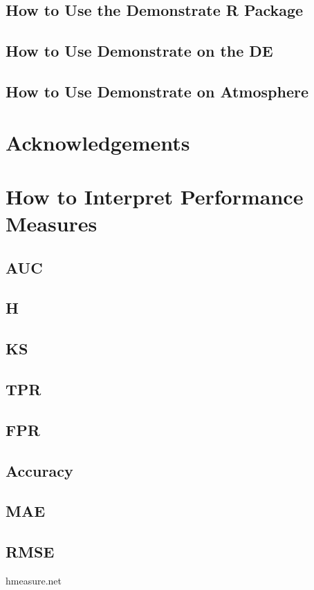 \documentclass[twoside,a4paper]{refart}
\begin{document}
\subsection{How to Use the Demonstrate R Package}

\subsection{How to Use Demonstrate on the DE}

\subsection{How to Use Demonstrate on Atmosphere}

\section{Acknowledgements}

\section{How to Interpret Performance Measures}

\subsection{AUC}

\subsection{H}

\subsection{KS}

\subsection{TPR}

\subsection{FPR}

\subsection{Accuracy}

\subsection{MAE}

\subsection{RMSE}

hmeasure.net
\end{document}
